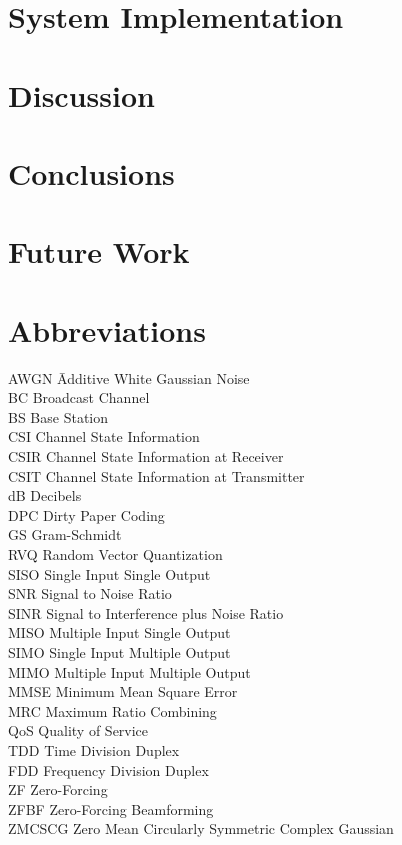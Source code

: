 \documentclass[a4paper,twoside,phd]{BYUPhys}
\begin{document}
\chapter{System Implementation}
\chapter{Discussion}
\chapter{Conclusions}
\chapter{Future Work}
\chapter{Abbreviations}
\label{chap:abbreviations}

\begin{tabbing}

AWGN \qquad \qquad \= Additive White Gaussian Noise\\
BC \> Broadcast Channel\\
BS \> Base Station\\
CSI \> Channel State Information\\
CSIR \> Channel State Information at Receiver\\
CSIT \> Channel State Information at Transmitter\\
dB \> Decibels\\
DPC \> Dirty Paper Coding\\
GS \> Gram-Schmidt\\
RVQ \> Random Vector Quantization\\
SISO \> Single Input Single Output\\
SNR \> Signal to Noise Ratio\\
SINR \> Signal to Interference plus Noise Ratio\\
MISO \> Multiple Input Single Output\\
SIMO \> Single Input Multiple Output\\
MIMO \> Multiple Input Multiple Output\\
MMSE \> Minimum Mean Square Error\\
MRC \> Maximum Ratio Combining\\ 
QoS \> Quality of Service\\
TDD \> Time Division Duplex\\
FDD \> Frequency Division Duplex\\
ZF \> Zero-Forcing\\
ZFBF \> Zero-Forcing Beamforming\\
ZMCSCG \> Zero Mean Circularly Symmetric Complex Gaussian\\

\end{tabbing}
\end{document}
